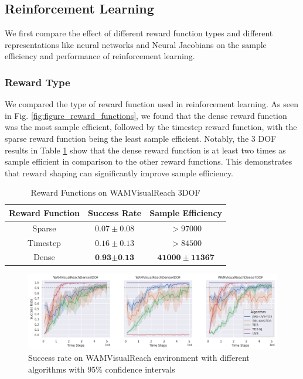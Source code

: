 \documentclass[letterpaper, 10 pt, conference]{ieeeconf}  %
\begin{document}
\subsection{Reinforcement Learning}

We first compare the effect of different reward function types and
different representations like neural networks and Neural Jacobians
on the sample efficiency and performance of reinforcement learning.


\subsubsection{Reward Type}

We compared the type of reward function used in reinforcement learning. As seen
in Fig. \ref{fig:figure_reward_functions}, we found that the dense reward
function was the most sample efficient, followed by the timestep reward
function, with the sparse reward function being the least sample efficient.
Notably, the 3 DOF results in Table \ref{tab:reward_type} show that the dense
reward function is at least two times as sample efficient in comparison to the
other reward functions. This demonstrates that reward shaping can significantly
improve sample efficiency.


\begin{table}[h] \caption{Reward Functions on WAMVisualReach 3DOF} \label{tab:reward_type}
    \begin{center}
        \begin{tabular}{|c|c|c|}
            \hline
            Reward Function & Success Rate & Sample Efficiency \\
            \hline
            Sparse & $0.07 \pm 0.08$ & $> 97000$  \\
            \hline
            Timestep & $0.16 \pm 0.13$ & $> 84500$  \\
            \hline
            Dense & $\textbf{0.93} \pm \textbf{0.13}$ & $\mathbf{41000} \pm \mathbf{11367}$ \\
            \hline
        \end{tabular}
    \end{center}
\end{table}

\begin{figure}[thpb]
    \centering
    \includegraphics[width=\linewidth]{successes.alg.timesteps.png}
    \caption{Success rate on WAMVisualReach environment with different algorithms with 95\% confidence intervals}
    \label{figure_results}
\end{figure}
\end{document}
